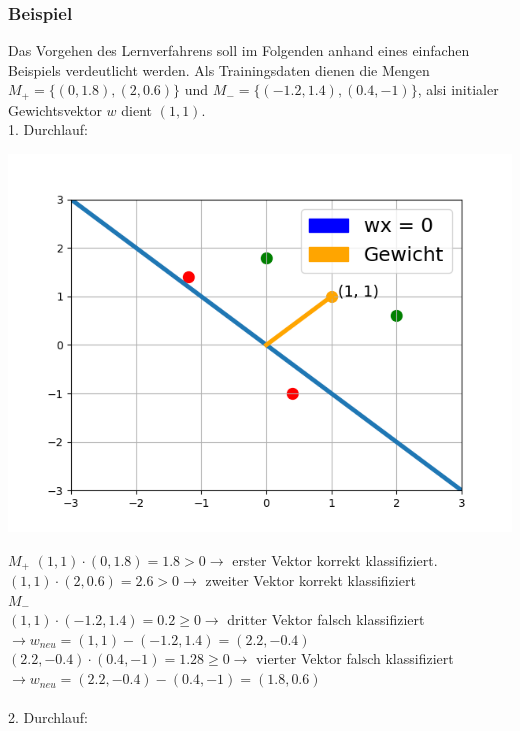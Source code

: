 \documentclass[a4paper]{scrartcl}
\newenvironment{Figure}
  {\par\medskip\noindent\minipage{\linewidth}}
  {\endminipage\par\medskip}
\begin{document}
\begin{multicols}{2}
                    \subsubsection{Beispiel}
                        Das Vorgehen des Lernverfahrens soll im Folgenden anhand eines einfachen Beispiels verdeutlicht werden.
                        \newline
                        Als Trainingsdaten dienen die Mengen $M_+ = \{(0,1.8),(2,0.6)\}$ und \newline $M_- = \{(-1.2,1.4),(0.4,-1)\}$, alsi initialer Gewichtsvektor $w$ dient $(1,1)$.\\
                        1. Durchlauf:\\
                        \begin{Figure}
                            \centering
                            \includegraphics[width=\linewidth]{bsp1.png}
                        \end{Figure}
                        $M_+$
                        $(1,1)\cdot(0,1.8) = 1.8 > 0 \rightarrow $ erster Vektor korrekt klassifiziert.\\
                        $(1,1)\cdot(2,0.6) = 2.6 > 0 \rightarrow$ zweiter Vektor korrekt klassifiziert\\
                        $M_-$\\
                        $(1,1)\cdot(-1.2,1.4) = 0.2 \geq 0 \rightarrow$ dritter Vektor falsch klassifiziert\\
                        $\rightarrow w_{neu} = (1,1)-(-1.2,1.4) = (2.2,-0.4)$\\
                        $(2.2,-0.4) \cdot (0.4,-1) = 1.28 \geq 0 \rightarrow$ vierter Vektor falsch klassifiziert\\
                        $\rightarrow w_{neu} = (2.2,-0.4)-(0.4,-1) = (1.8,0.6)$\\
                        \\
                        2. Durchlauf:\\


\end{multicols}
\end{document}
